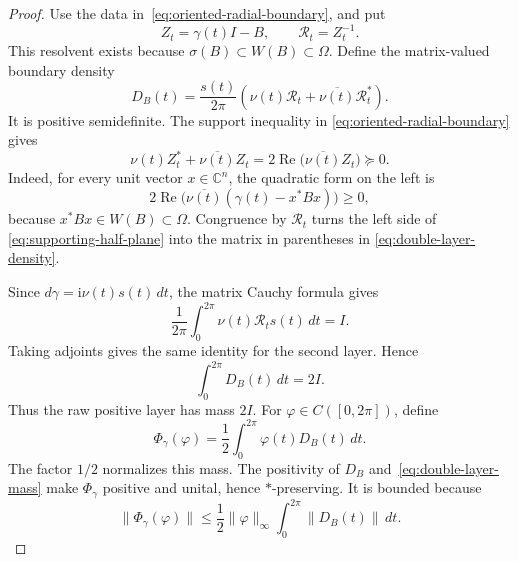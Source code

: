\documentclass[preprints,article,submit,oneauthor]{Definitions/mdpi}
\theoremstyle{mdpi}
\theoremstyle{definition}
\newcommand{\C}{\mathbb C}
\newcommand{\RePart}{\operatorname{Re}}
\newcommand{\iu}{\mathrm{i}}
\begin{document}
\begin{proof}
Use the data in~\eqref{eq:oriented-radial-boundary}, and put
\[
  Z_t=\gamma(t)I-B,
  \qquad
  \mathcal R_t=Z_t^{-1}.
\]
This resolvent exists because
$\sigma(B)\subset W(B)\subset\Omega$.  Define the matrix-valued
boundary density
\begin{equation}
  D_B(t)=\frac{s(t)}{2\pi}
  \left(
    \nu(t)\mathcal R_t+
    \overline{\nu(t)}\mathcal R_t^*
  \right).
  \label{eq:double-layer-density}
\end{equation}
It is positive semidefinite.  The support inequality in
\eqref{eq:oriented-radial-boundary} gives
\begin{equation}
  \nu(t)Z_t^*+\overline{\nu(t)}Z_t
  =2\RePart\bigl(\overline{\nu(t)}Z_t\bigr)\succeq0.
  \label{eq:supporting-half-plane}
\end{equation}
Indeed, for every unit vector $x\in\C^n$, the quadratic form on the
left is
\[
  2\RePart\bigl(\overline{\nu(t)}
  (\gamma(t)-x^*Bx)\bigr)\geq0,
\]
because $x^*Bx\in W(B)\subset\Omega$.
Congruence by $\mathcal R_t$ turns the left side of
\eqref{eq:supporting-half-plane} into the matrix in parentheses in
\eqref{eq:double-layer-density}.

Since $d\gamma=\iu\nu(t)s(t)\,dt$, the matrix Cauchy formula gives
\begin{equation}
  \frac{1}{2\pi}\int_0^{2\pi}
  \nu(t)\mathcal R_t s(t)\,dt=I.
  \label{eq:first-layer-mass}
\end{equation}
Taking adjoints gives the same identity for the second layer.  Hence
\begin{equation}
  \int_0^{2\pi}D_B(t)\,dt=2I.
  \label{eq:double-layer-mass}
\end{equation}
Thus the raw positive layer has mass $2I$.  For
$\varphi\in C([0,2\pi])$, define
\begin{equation}
  \Phi_\gamma(\varphi)=\frac12\int_0^{2\pi}
  \varphi(t)D_B(t)\,dt.
  \label{eq:Phi-definition}
\end{equation}
The factor $1/2$ normalizes this mass.  The positivity of $D_B$
and~\eqref{eq:double-layer-mass} make $\Phi_\gamma$ positive and
unital, hence $*$-preserving.  It is bounded because
\[
  \lVert\Phi_\gamma(\varphi)\rVert
  \leq\frac12\lVert\varphi\rVert_\infty
  \int_0^{2\pi}\lVert D_B(t)\rVert\,dt.
\]
\end{proof}
\end{document}
